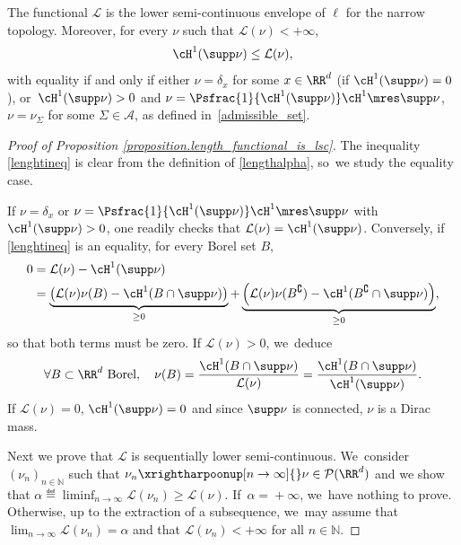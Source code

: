 \begin{proposition}
\label{proposition.length_functional_is_lsc}
The functional $\mathcal{L}$ is the lower semi-continuous envelope of $\ell$ for the narrow topology. Moreover, for every $\nu$ such that $\mathcal{L}(\nu)<+\infty$,
\begin{equation}\label{lenghtineq}
\cH^1(\supp \nu)\leq \mathcal{L}(\nu),
\end{equation}
with equality if and only if either $\nu=\delta_x$ for some $x \in \RR^d$ (if $\cH^1(\supp\nu)=0$), or~$\cH^1(\supp\nu)>0$ and $ \nu=\Psfrac{1}{\cH^1(\supp \nu)}\cH^1\mres \supp \nu$, \ie $\nu = \nu_\Sigma$ for some $\Sigma \in \mathcal{A}$, as defined in~\eqref{admissible_set}.
\end{proposition}

\begin{proof}[Proof of Proposition \ref{proposition.length_functional_is_lsc}]
The inequality \eqref{lenghtineq} is clear from the definition of \eqref{lengthalpha}, so~we study the equality case.

If $\nu=\delta_x$ or $\nu=\Psfrac{1}{\cH^1(\supp \nu)}\cH^1\mres \supp \nu$ with $\cH^1(\supp\nu)>0$, one readily checks that $\mathcal{L}(\nu)=\cH^1(\supp \nu)$.
Conversely, if \eqref{lenghtineq} is an equality, for every Borel set $B$,
\begin{align*}
0 &= \mathcal{L}(\nu)-\cH^1(\supp\nu) \\
&= \underbrace{\left(\mathcal{L}(\nu)\nu(B)-\cH^1(B\cap \supp\nu)\right)}_{\geq 0}+ \underbrace{\left(\mathcal{L}(\nu)\nu(B^\complement)-\cH^1(B^\complement\cap \supp\nu)\right)}_{\geq 0},
\end{align*}
so that both terms must be zero. If $\mathcal{L}(\nu)>0$, we~deduce
\begin{equation*}
\forall B\subset \RR^d\ \mbox{Borel},\quad \nu(B) = \frac{\cH^1(B\cap \supp\nu)}{\mathcal{L}(\nu)}= \frac{\cH^1(B\cap \supp\nu)}{\cH^1(\supp \nu)}.
\end{equation*}
If $\mathcal{L}(\nu)=0$, $\cH^1(\supp\nu)=0$ and since $\supp \nu$ is connected, $\nu$ is a Dirac mass.

Next we prove that $\mathcal{L}$ is sequentially lower semi-continuous. We~consider $(\nu_{n})_{n\in \mathbb{N}}$ such that $\nu_n \xrightharpoonup[n \to \infty]{} \nu \in \mathcal{P}(\RR^d)$ and we show that $\alpha \eqdef \liminf_{n \to \infty} \mathcal{L}(\nu_n) \geq \mathcal{L}(\nu)$. If~$\alpha\!=\!+\infty$, we~have nothing to prove. Otherwise, up to the extraction of a subsequence, we~may assume that $\lim_{n \to \infty} \mathcal{L}(\nu_n)=\alpha$ and that $\mathcal{L}(\nu_n)<+\infty$ for all $n \in \mathbb{N}$.


\end{proof}

